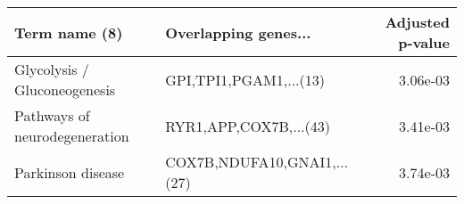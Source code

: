 \begin{tabular}{llr}
\toprule
                Term name (8) &        Overlapping genes... &  Adjusted p-value \\
\midrule
 Glycolysis / Gluconeogenesis &      GPI,TPI1,PGAM1,...(13) &          3.06e-03 \\
Pathways of neurodegeneration &      RYR1,APP,COX7B,...(43) &          3.41e-03 \\
            Parkinson disease & COX7B,NDUFA10,GNAI1,...(27) &          3.74e-03 \\
\bottomrule
\end{tabular}
